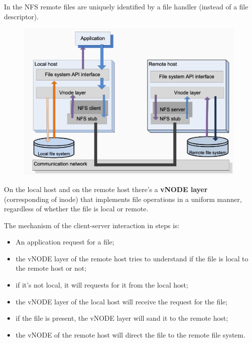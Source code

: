 In the NFS remote files are uniquely identified by a file handler (instead of a file descriptor).
\begin{figure}[h!]
    \centering
    \includegraphics[scale=0.35]{images/NFS.png}
\end{figure}

On the local host and on the remote host there's a \textbf{vNODE layer} (corresponding of inode) that implements file operations in a uniform manner, regardless of whether the file is local or remote.

The mechanism of the client-server interaction in steps is:
\begin{itemize}
    \item An application request for a file;
    \item the vNODE layer of the remote host tries to understand if the file is local to the remote host or not;
    \item if it's not local, it will requests for it from the local host;
    \item the vNODE layer of the local host will receive the request for the file;
    \item if the file is present, the vNODE layer will sand it to the remote host;
    \item the vNODE of the remote host will direct the file to the remote file system.
\end{itemize}


